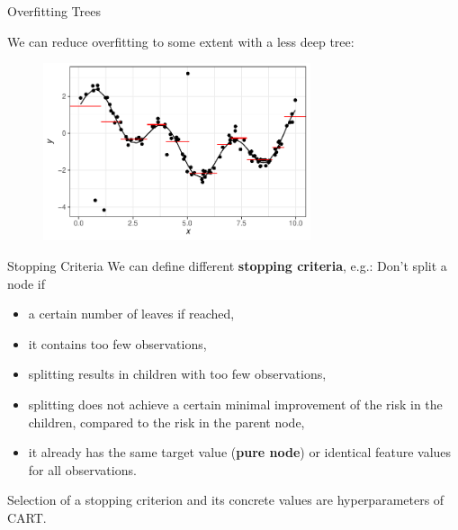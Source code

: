 \documentclass[11pt,compress,t,notes=noshow, xcolor=table]{beamer}
\begin{document}
\begin{vbframe}{Overfitting Trees}

We can reduce overfitting to some extent with a less deep tree:
\vspace{0.25cm}

\begin{figure}
\centering
\includegraphics[width=0.7\textwidth]{figure/tree-less-overfitting-prediction.pdf}
\end{figure}

\end{vbframe}

\begin{vbframe}{Stopping Criteria}
We can define different \textbf{stopping criteria}, e.g.: Don't split a node if
  \begin{itemize}
    \item a certain number of leaves if reached,
    \item it contains too few observations,
    \item splitting results in children with too few observations,
    \item splitting does not achieve a certain minimal improvement of the risk in the children, compared to the risk in the parent node,
    \item it already has the same target value (\textbf{pure node}) or identical feature values for all observations. 
  \end{itemize}
Selection of a stopping criterion and its concrete values are hyperparameters of CART.
\end{vbframe}
\end{document}
